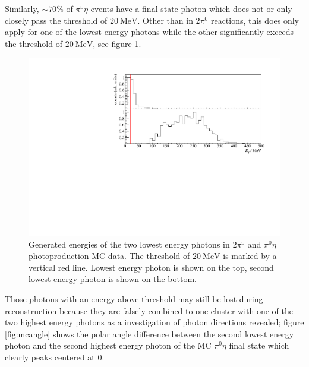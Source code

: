  Similarly, $\sim70\%$ of $\pi^0\eta$ events have a final state photon which does not or only closely pass the threshold of $\SI{20}{\mega\eV}$. Other than in $2\pi^0$ reactions, this does only apply for one of the lowest energy photons while the other significantly exceeds the threshold of $\SI{20}{\mega\eV}$, see figure \ref{fig:mcgammas_b}. 
 \begin{figure}[htbp]
 	\centering
 	\includegraphics[width=\linewidth]{../figs/hydrogen/mcgammas_pi0eta.pdf}
 	\caption{Generated energies of the two lowest energy photons in $2\pi^0$ and $\pi^0\eta$ photoproduction MC data. The threshold of $\SI{20}{\mega\eV}$ is marked by a vertical red line. Lowest energy photon is shown on the top, second lowest energy photon is shown on the bottom.}
 	\label{fig:mcgammas_b}			
 \end{figure}
 Those photons with an energy above threshold may still be lost during reconstruction because they are falsely combined to one cluster with one of the two highest energy photons as a investigation of photon directions revealed; figure \ref{fig:mcangle} shows the polar angle difference between the second lowest energy photon and the second highest energy photon of the MC $\pi^0\eta$ final state which clearly peaks centered at $0$. 
